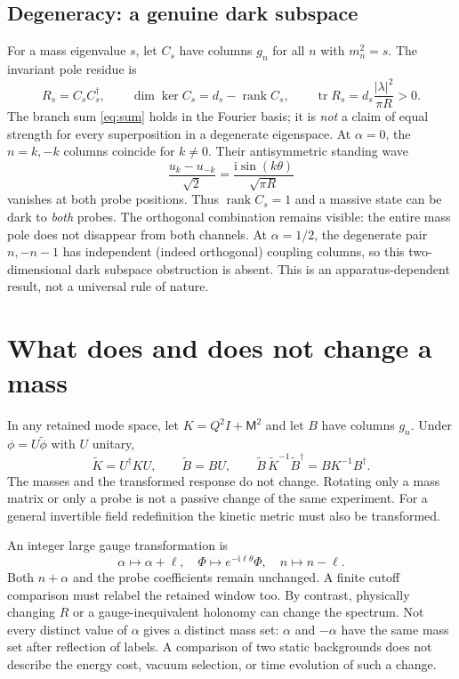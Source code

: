 \documentclass[11pt,a4paper]{article}
\newcommand{\ii}{\mathrm{i}}
\begin{document}
\subsection*{Degeneracy: a genuine dark subspace}
For a mass eigenvalue $s$, let $C_s$ have columns $g_n$ for all
$n$ with $m_n^2=s$. The invariant pole residue is
\begin{equation}\label{eq:deg}
 R_s=C_sC_s^\dagger,\qquad
 \dim\ker C_s=d_s-\operatorname{rank}C_s,\qquad
 \operatorname{tr}R_s=d_s\frac{|\lambda|^2}{\pi R}>0 .
\end{equation}
The branch sum \eqref{eq:sum} holds in the Fourier basis; it is
\emph{not} a claim of equal strength for every superposition in a
degenerate eigenspace. At $\alpha=0$, the $n=k,-k$ columns coincide
for $k\ne0$. Their antisymmetric standing wave
\begin{equation}
 \frac{u_k-u_{-k}}{\sqrt2}
  =\frac{\ii\sin(k\theta)}{\sqrt{\pi R}}
\end{equation}
vanishes at both probe positions. Thus $\operatorname{rank}C_s=1$
and a massive state can be dark to \emph{both} probes.
The orthogonal combination remains visible: the entire mass pole
does not disappear from both channels. At $\alpha=1/2$, the
degenerate pair $n,-n-1$ has independent (indeed orthogonal) coupling
columns, so this two-dimensional dark subspace obstruction is absent.
This is an apparatus-dependent result, not a universal rule of nature.

\section{What does and does not change a mass}
In any retained mode space, let $K=Q^2I+\mathsf M^2$ and let $B$ have
columns $g_n$. Under $\phi=U\widetilde\phi$ with $U$ unitary,
\begin{equation}
 \widetilde K=U^\dagger K U,\qquad
 \widetilde B=BU,\qquad
 \widetilde B\,\widetilde K^{-1}\widetilde B^\dagger
 =BK^{-1}B^\dagger .
\end{equation}
The masses and the transformed response do not change. Rotating
only a mass matrix or only a probe is not a passive change of the
same experiment. For a general invertible field redefinition the
kinetic metric must also be transformed.

An integer large gauge transformation is
\begin{equation}
 \alpha\mapsto\alpha+\ell,\quad
 \Phi\mapsto e^{-\ii\ell\theta}\Phi,\quad
 n\mapsto n-\ell .
\end{equation}
Both $n+\alpha$ and the probe coefficients remain unchanged.
A finite cutoff comparison must relabel the retained window too.
By contrast, physically changing $R$ or a gauge-inequivalent holonomy
can change the spectrum. Not every distinct value of $\alpha$ gives
a distinct mass set: $\alpha$ and $-\alpha$ have the same mass set
after reflection of labels. A comparison of two static backgrounds
does not describe the energy cost, vacuum selection, or time
evolution of such a change.
\end{document}
